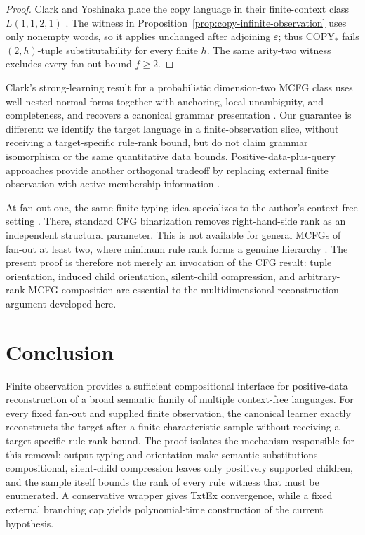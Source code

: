 \documentclass[11pt,a4paper]{article}
\numberwithin{equation}{section}
\theoremstyle{plain}
\theoremstyle{definition}
\theoremstyle{remark}
\newcommand{\eps}{\varepsilon}
\begin{document}
\begin{proof}
Clark and Yoshinaka place the copy language in their finite-context class
$L(1,1,2,1)$ \cite[Definition~2 and Example~3]{ClarkYoshinaka2012PMCFG}.
The witness in Proposition~\ref{prop:copy-infinite-observation} uses only
nonempty words, so it applies unchanged after adjoining $\eps$; thus
$\mathrm{COPY}_*$ fails $(2,h)$-tuple substitutability for every finite $h$.
The same arity-two witness excludes every fan-out bound $f\ge2$.
\end{proof}

Clark's strong-learning result for a probabilistic dimension-two MCFG class
uses well-nested normal forms together with anchoring, local unambiguity, and
completeness, and recovers a canonical grammar presentation
\cite{Clark2021Strong}.  Our guarantee is different: we identify the target
language in a finite-observation slice, without receiving a target-specific
rule-rank bound, but do not claim grammar isomorphism or the same quantitative
data bounds.  Positive-data-plus-query approaches provide another orthogonal
tradeoff by replacing external finite observation with active membership
information \cite{Yoshinaka2010,KanazawaYoshinaka2021,KanazawaYoshinaka2023,YoshinakaClark2012}.

At fan-out one, the same finite-typing idea specializes to the author's
context-free setting \cite{kuriyamaCFG}.  There, standard CFG binarization
removes right-hand-side rank as an independent structural parameter.  This is
not available for general MCFGs of fan-out at least two, where minimum rule
rank forms a genuine hierarchy \cite{RambowSatta1999}.  The
present proof is therefore not merely an invocation of the CFG result: tuple
orientation, induced child orientation, silent-child compression, and
arbitrary-rank MCFG composition are essential to the multidimensional
reconstruction argument developed here.


\section{Conclusion}
\label{sec:conclusion}

Finite observation provides a sufficient compositional interface for
positive-data reconstruction of a broad semantic family of multiple
context-free languages.  For every fixed fan-out and supplied finite
observation, the canonical learner exactly reconstructs the target after a
finite characteristic sample without receiving a target-specific rule-rank
bound.  The proof isolates the mechanism responsible for this removal:
output typing and orientation make semantic substitutions compositional,
silent-child compression leaves only positively supported children, and the
sample itself bounds the rank of every rule witness that must be enumerated.
A conservative wrapper gives TxtEx convergence, while a fixed external
branching cap yields polynomial-time construction of the current hypothesis.
\end{document}
